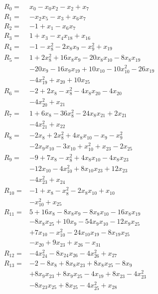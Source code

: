 \allowdisplaybreaks[4]
\begin{align*}
R_{0}={}&x_{0} -x_{0}x_{2} -x_{2} +x_{7}\\[3pt]
R_{1}={}&-x_{2}x_{5} -x_{3} +x_{6}x_{7}\\[3pt]
R_{2}={}&-1 +x_{1} -x_{6}x_{7}\\[3pt]
R_{3}={}&1 +x_{3} -x_{4}x_{18} +x_{16}\\[3pt]
R_{4}={}&-1 -x_{8}^{2} -2x_{8}x_{9} -x_{9}^{2} +x_{19}\\[3pt]
R_{5}={}&1 +2x_{8}^{2} +16x_{8}x_{9} -20x_{8}x_{10} -8x_{8}x_{19}\\
&-20x_{9} -16x_{9}x_{19} +10x_{10} -10x_{10}^{2} -26x_{19}\\
&-4x_{19}^{2} +x_{20} +10x_{25}\\[3pt]
R_{6}={}&-2 +2x_{8} -x_{8}^{2} -4x_{8}x_{20} -4x_{20}\\
&-4x_{20}^{2} +x_{21}\\[3pt]
R_{7}={}&1 +6x_{8} -36x_{8}^{2} -24x_{8}x_{21} +2x_{21}\\
&-4x_{21}^{2} +x_{22}\\[3pt]
R_{8}={}&-2x_{8} +2x_{8}^{2} +4x_{8}x_{10} -x_{9} -x_{9}^{2}\\
&-2x_{9}x_{10} -3x_{10} +x_{10}^{2} +x_{23} -2x_{25}\\[3pt]
R_{9}={}&-9 +7x_{8} -x_{8}^{2} +4x_{8}x_{10} -4x_{8}x_{23}\\
&-12x_{10} -4x_{10}^{2} +8x_{10}x_{23} +12x_{23}\\
&-4x_{23}^{2} +x_{24}\\[3pt]
R_{10}={}&-1 +x_{8} -x_{8}^{2} -2x_{8}x_{10} +x_{10}\\
&-x_{10}^{2} +x_{25}\\[3pt]
R_{11}={}&5 +16x_{8} -8x_{8}x_{9} -8x_{8}x_{10} -16x_{8}x_{19}\\
&-8x_{8}x_{25} +10x_{9} -54x_{9}x_{10} -12x_{9}x_{25}\\
&+7x_{10} -x_{10}^{2} -24x_{10}x_{19} -8x_{19}x_{25}\\
&-x_{20} +9x_{23} +x_{26} -x_{31}\\[3pt]
R_{12}={}&-4x_{24}^{2} -8x_{24}x_{26} -4x_{26}^{2} +x_{27}\\[3pt]
R_{13}={}&-2 -8x_{8} +8x_{8}x_{23} +8x_{8}x_{25} -8x_{9}\\
&+8x_{9}x_{23} +8x_{9}x_{25} -4x_{19} +8x_{23} -4x_{23}^{2}\\
&-8x_{23}x_{25} +8x_{25} -4x_{25}^{2} +x_{28}\\[3pt]

\end{align*}
